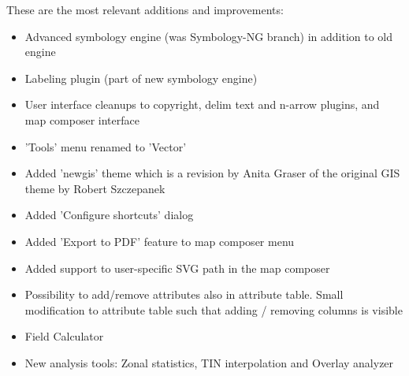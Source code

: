These are the most relevant additions and improvements:
\begin{itemize}
 \item Advanced symbology engine (was Symbology-NG branch) in addition to old engine
 \item Labeling plugin (part of new symbology engine)
 \item User interface cleanups to copyright, delim text and n-arrow plugins, and map composer interface
 \item 'Tools' menu renamed to 'Vector' 
 \item Added 'newgis' theme which is a revision by Anita Graser of the original GIS theme by Robert Szczepanek
 \item Added 'Configure shortcuts' dialog 
 \item Added 'Export to PDF' feature to map composer menu 
 \item Added support to user-specific SVG path in the map composer 
 \item Possibility to add/remove attributes also in attribute table. Small modification to attribute table such that adding / removing columns is visible
 \item Field Calculator
 \item New analysis tools: Zonal statistics, TIN interpolation and Overlay analyzer
\end{itemize}



